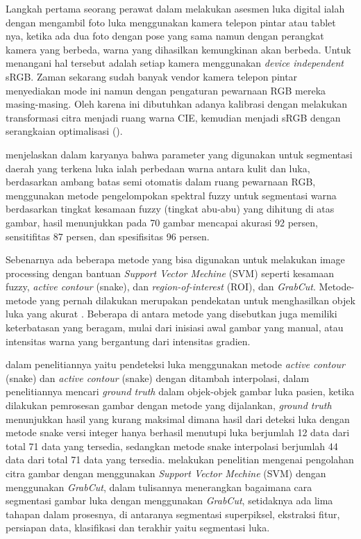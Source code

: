 Langkah pertama seorang perawat dalam melakukan asesmen luka digital ialah dengan 
mengambil foto luka menggunakan kamera telepon pintar atau tablet nya, ketika ada 
dua foto dengan pose yang sama namun dengan perangkat kamera yang berbeda, warna 
yang dihasilkan kemungkinan akan berbeda. Untuk menangani hal tersebut adalah setiap 
kamera menggunakan \emph{device independent} sRGB. Zaman sekarang sudah banyak vendor kamera 
telepon pintar menyediakan mode ini namun dengan pengaturan pewarnaan RGB mereka 
masing-masing. Oleh karena ini dibutuhkan adanya kalibrasi dengan melakukan 
transformasi citra menjadi ruang warna CIE, kemudian menjadi sRGB dengan serangkaian 
optimalisasi (\cite{Rizki:2022}).

\cite{Silva:2021} menjelaskan dalam karyanya bahwa parameter yang digunakan untuk 
segmentasi daerah yang terkena luka ialah perbedaan warna antara kulit dan luka, 
berdasarkan ambang batas semi otomatis dalam ruang pewarnaan RGB, 
\cite{ManoharDhane:2017} menggunakan metode pengelompokan spektral fuzzy untuk segmentasi warna 
berdasarkan tingkat kesamaan fuzzy (tingkat abu-abu) yang dihitung di atas gambar, 
hasil menunjukkan pada 70 gambar mencapai akurasi 92 persen, sensitifitas 87 persen, dan spesifisitas 96 persen.


Sebenarnya ada beberapa metode yang bisa digunakan untuk melakukan image processing 
dengan bantuan \emph{Support Vector Mechine} (SVM) seperti kesamaan fuzzy, \emph{active contour} 
(snake), dan \emph{region-of-interest} (ROI), dan \emph{GrabCut}. Metode-metode yang pernah dilakukan 
merupakan pendekatan untuk menghasilkan objek luka yang akurat \cite{Garcia-Zapirain:2017}. 
Beberapa di antara metode yang disebutkan juga memiliki keterbatasan yang beragam, 
mulai dari inisiasi awal gambar yang manual, atau intensitas warna yang bergantung 
dari intensitas gradien. 


\cite{Rizki:2022} dalam penelitiannya yaitu pendeteksi luka menggunakan metode 
\emph{active contour} (snake) dan \emph{active contour} (snake) dengan ditambah 
interpolasi, dalam penelitiannya mencari  \emph{ground truth} dalam objek-objek gambar 
luka pasien, ketika dilakukan pemrosesan gambar dengan metode yang dijalankan, \emph{ground truth} menunjukkan hasil yang kurang maksimal dimana hasil dari deteksi 
luka dengan metode snake versi integer hanya berhasil menutupi luka berjumlah 
12 data dari total 71 data yang tersedia, sedangkan metode snake interpolasi 
berjumlah 44 data dari total 71 data yang tersedia. \cite{Silva:2021} melakukan 
penelitian mengenai pengolahan citra gambar dengan menggunakan \emph{Support Vector Mechine} 
(SVM) dengan menggunakan \emph{GrabCut}, dalam tulisannya menerangkan bagaimana cara segmentasi 
gambar luka dengan menggunakan \emph{GrabCut},  setidaknya ada lima tahapan dalam prosesnya, 
di antaranya segmentasi superpiksel, ekstraksi fitur, persiapan data, klasifikasi 
dan terakhir yaitu segmentasi luka. 


